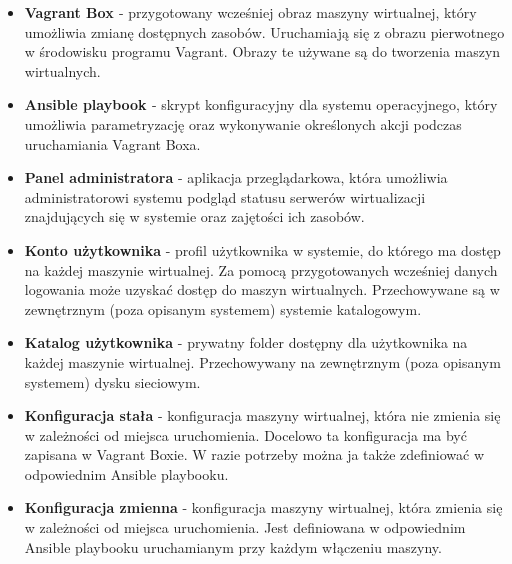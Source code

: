 \documentclass[../wstep.tex]{subfiles}
\begin{document}
\begin{itemize}
  \item \textbf{Vagrant Box \parencite{vagrantbox}} - przygotowany wcześniej obraz maszyny wirtualnej, który umożliwia zmianę dostępnych zasobów. Uruchamiają się z obrazu pierwotnego w środowisku programu Vagrant. Obrazy te używane są do tworzenia maszyn wirtualnych.
  \item \textbf{Ansible playbook \parencite{ansible-playbook}} - skrypt konfiguracyjny dla systemu operacyjnego, który umożliwia parametryzację oraz wykonywanie określonych akcji podczas uruchamiania Vagrant Boxa.
  \item \textbf{Panel administratora} - aplikacja przeglądarkowa, która umożliwia administratorowi systemu podgląd statusu serwerów wirtualizacji znajdujących się w systemie oraz zajętości ich zasobów.
  \item \textbf{Konto użytkownika} - profil użytkownika w systemie, do którego ma dostęp na każdej maszynie wirtualnej. Za pomocą przygotowanych wcześniej danych logowania może uzyskać dostęp do maszyn wirtualnych. Przechowywane są w zewnętrznym (poza opisanym systemem) systemie katalogowym.
  \item \textbf{Katalog użytkownika} - prywatny folder dostępny dla użytkownika na każdej maszynie wirtualnej. Przechowywany na zewnętrznym (poza opisanym systemem) dysku sieciowym.
  \item \textbf{Konfiguracja stała} - konfiguracja maszyny wirtualnej, która nie zmienia się w zależności od miejsca uruchomienia. Docelowo ta konfiguracja ma być zapisana w Vagrant Boxie. W razie potrzeby można ja także zdefiniować w odpowiednim Ansible playbooku.
  \item \textbf{Konfiguracja zmienna} - konfiguracja maszyny wirtualnej, która zmienia się w zależności od miejsca uruchomienia. Jest definiowana w odpowiednim Ansible playbooku uruchamianym przy każdym włączeniu maszyny.
\end{itemize}
\end{document}
